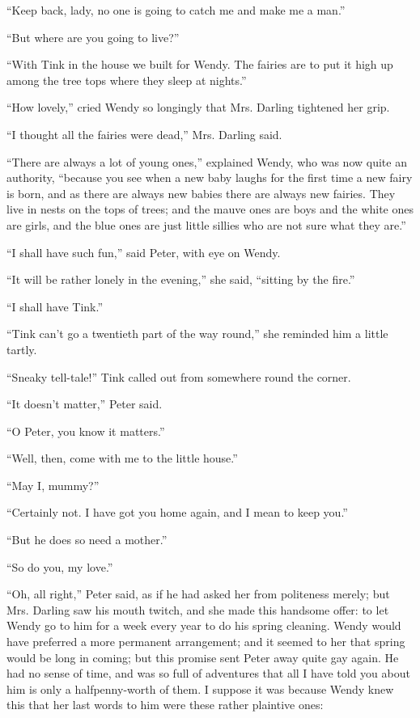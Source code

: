 ``Keep back, lady, no one is going to catch me and make me a man.''

``But where are you going to live?''

``With Tink in the house we built for Wendy. The fairies are to put it
high up among the tree tops where they sleep at nights.''

``How lovely,'' cried Wendy so longingly that Mrs. Darling tightened her
grip.

``I thought all the fairies were dead,'' Mrs. Darling said.

``There are always a lot of young ones,'' explained Wendy, who was now
quite an authority, ``because you see when a new baby laughs for the
first time a new fairy is born, and as there are always new babies
there are always new fairies. They live in nests on the tops of trees;
and the mauve ones are boys and the white ones are girls, and the blue
ones are just little sillies who are not sure what they are.''

``I shall have such fun,'' said Peter, with eye on Wendy.

``It will be rather lonely in the evening,'' she said, ``sitting by the
fire.''

``I shall have Tink.''

``Tink can't go a twentieth part of the way round,'' she reminded him a
little tartly.

``Sneaky tell-tale!'' Tink called out from somewhere round the corner.

``It doesn't matter,'' Peter said.

``O Peter, you know it matters.''

``Well, then, come with me to the little house.''

``May I, mummy?''

``Certainly not. I have got you home again, and I mean to keep you.''

``But he does so need a mother.''

``So do you, my love.''

``Oh, all right,'' Peter said, as if he had asked her from politeness
merely; but Mrs. Darling saw his mouth twitch, and she made this
handsome offer: to let Wendy go to him for a week every year to do his
spring cleaning. Wendy would have preferred a more permanent
arrangement; and it seemed to her that spring would be long in coming;
but this promise sent Peter away quite gay again. He had no sense of
time, and was so full of adventures that all I have told you about him
is only a halfpenny-worth of them. I suppose it was because Wendy knew
this that her last words to him were these rather plaintive ones:

